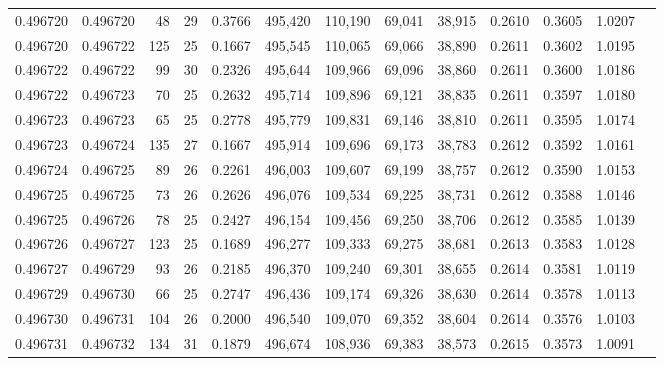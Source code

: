 \begin{tabular}{rrrrrrrrrrrrr}
0.496720 & 0.496720 &  48 &  29 &                                     0.3766 & 495,420 & 110,190 &  69,041 &  38,915 & 0.2610 & 0.3605 & 1.0207 \\
0.496720 & 0.496722 & 125 &  25 &                                     0.1667 & 495,545 & 110,065 &  69,066 &  38,890 & 0.2611 & 0.3602 & 1.0195 \\
0.496722 & 0.496722 &  99 &  30 &                                     0.2326 & 495,644 & 109,966 &  69,096 &  38,860 & 0.2611 & 0.3600 & 1.0186 \\
0.496722 & 0.496723 &  70 &  25 &                                     0.2632 & 495,714 & 109,896 &  69,121 &  38,835 & 0.2611 & 0.3597 & 1.0180 \\
0.496723 & 0.496723 &  65 &  25 &                                     0.2778 & 495,779 & 109,831 &  69,146 &  38,810 & 0.2611 & 0.3595 & 1.0174 \\
0.496723 & 0.496724 & 135 &  27 &                                     0.1667 & 495,914 & 109,696 &  69,173 &  38,783 & 0.2612 & 0.3592 & 1.0161 \\
0.496724 & 0.496725 &  89 &  26 &                                     0.2261 & 496,003 & 109,607 &  69,199 &  38,757 & 0.2612 & 0.3590 & 1.0153 \\
0.496725 & 0.496725 &  73 &  26 &                                     0.2626 & 496,076 & 109,534 &  69,225 &  38,731 & 0.2612 & 0.3588 & 1.0146 \\
0.496725 & 0.496726 &  78 &  25 &                                     0.2427 & 496,154 & 109,456 &  69,250 &  38,706 & 0.2612 & 0.3585 & 1.0139 \\
0.496726 & 0.496727 & 123 &  25 &                                     0.1689 & 496,277 & 109,333 &  69,275 &  38,681 & 0.2613 & 0.3583 & 1.0128 \\
0.496727 & 0.496729 &  93 &  26 &                                     0.2185 & 496,370 & 109,240 &  69,301 &  38,655 & 0.2614 & 0.3581 & 1.0119 \\
0.496729 & 0.496730 &  66 &  25 &                                     0.2747 & 496,436 & 109,174 &  69,326 &  38,630 & 0.2614 & 0.3578 & 1.0113 \\
0.496730 & 0.496731 & 104 &  26 &                                     0.2000 & 496,540 & 109,070 &  69,352 &  38,604 & 0.2614 & 0.3576 & 1.0103 \\
0.496731 & 0.496732 & 134 &  31 &                                     0.1879 & 496,674 & 108,936 &  69,383 &  38,573 & 0.2615 & 0.3573 & 1.0091 \\

\end{tabular}
